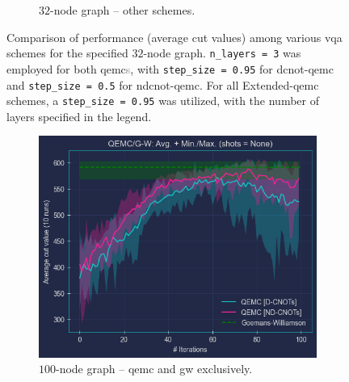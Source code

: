 \begin{figure}[hb!]
\begin{subfigure}[b]{0.495\textwidth}
        \caption{$32$-node graph – other schemes.}
        \label{fig:32-node_Graph}
    \end{subfigure}
    \caption{Comparison of performance (average cut values) among various \acrshort{vqa} schemes for the specified $32$-node graph. \texttt{n\_layers = 3} was employed for both \acrshort{qemc}\textcolor{gray}{s}, with \texttt{step\_size = 0.95} for \acrshort{dcnot}-\acrshort{qemc} and \texttt{step\_size = 0.5} for \acrshort{ndcnot}-\acrshort{qemc}. For all Extended-\acrshort{qemc} schemes, a \texttt{step\_size = 0.95} was utilized, with the number of layers specified in the legend.}
    \label{fig:32-node_Graph(2-Subfigures)}
\end{figure}

\clearpage

\begin{figure}[hb!]
    \centering
    \begin{subfigure}[b]{0.495\textwidth}
        \centering
        \includegraphics[width=1\textwidth]{Figures/Chapter_5/Large graphs/100-node_Graph(QEMC&G-W).png}
        \caption{$100$-node graph – \acrshort{qemc} and \acrshort{gw} exclusively.}
        \label{fig:100-node_Graph(QEMC&G-W)}
    \end{subfigure}
    \hfill
    \begin{subfigure}[b]{0.495\textwidth}
        \centering

\end{subfigure}
\end{figure}

